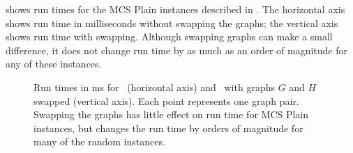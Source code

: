 shows run times for the MCS Plain instances described in .
The horizontal axis shows run time in milliseconds
without swapping the graphs; the vertical axis shows run time with swapping.  Although swapping
graphs can make a small difference, it does not change run time by as much as an order of 
magnitude for any of these instances.

\begin{figure}[h!]
    \centering
    \caption{Run times in ms for \McSplit\ (horizontal axis) and \McSplit\ with graphs $G$ and $H$ swapped
        (vertical axis).  Each point represents one graph pair.  Swapping the graphs has little effect on run time
        for MCS Plain instances, but changes the run time by orders of magnitude
        for many of the random instances.}\label{figure:runtime-swapping-scatter}
\end{figure}

